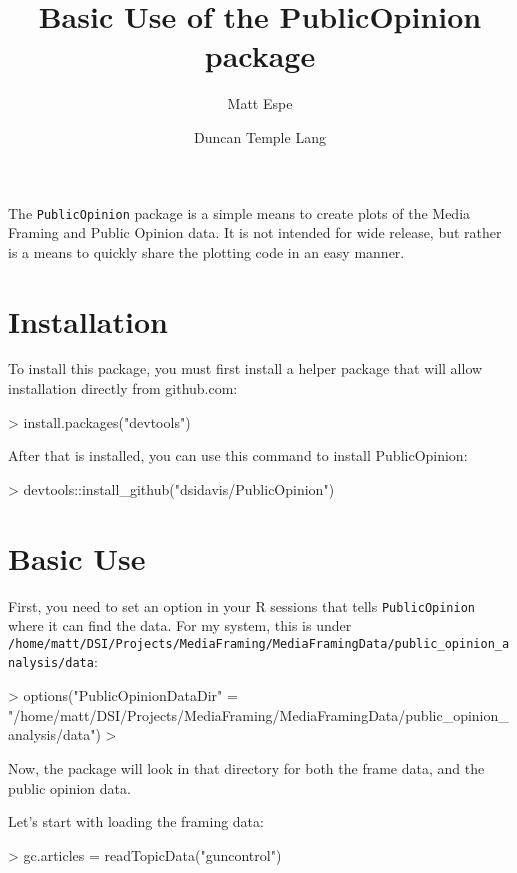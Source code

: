 \documentclass{article}
\title{Basic Use of the PublicOpinion package}
\author{Matt Espe}
\author{Duncan Temple Lang}
\begin{document}
The \texttt{PublicOpinion} package is a simple means to create plots of
the Media Framing and Public Opinion data. It is not intended for wide
release, but rather is a means to quickly share the plotting code in
an easy manner.  


\section{Installation}

To install this package, you must first install a helper package that
will allow installation directly from github.com:

\begin{Schunk}
\begin{Sinput}
> install.packages("devtools")
\end{Sinput}
\end{Schunk}

After that is installed, you can use this command to install
PublicOpinion:

\begin{Schunk}
\begin{Sinput}
> devtools::install_github("dsidavis/PublicOpinion")
\end{Sinput}
\end{Schunk}

\section{Basic Use}

First, you need to set an option in your R sessions that tells
\texttt{PublicOpinion} where it can find the data. For my system, this
is under \texttt{/home/matt/DSI/Projects/MediaFraming/MediaFramingData/public\_opinion\_analysis/data}:

\begin{Schunk}
\begin{Sinput}
> options("PublicOpinionDataDir" = "/home/matt/DSI/Projects/MediaFraming/MediaFramingData/public_opinion_analysis/data")
> 
\end{Sinput}
\end{Schunk}

Now, the package will look in that directory for both the frame data,
and the public opinion data.

Let's start with loading the framing data:

\begin{Schunk}
\begin{Sinput}
> gc.articles = readTopicData("guncontrol")
\end{Sinput}
\end{Schunk}
\end{document}

